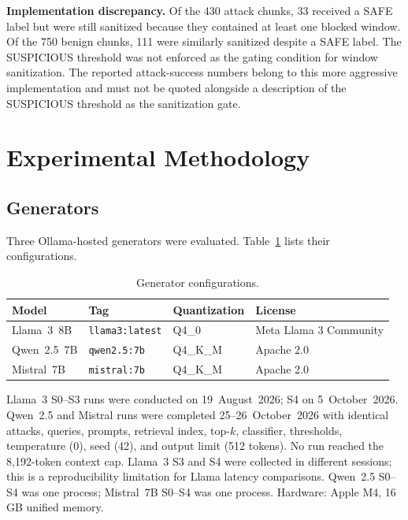 \documentclass[journal]{IEEEtran}
\begin{document}
\textbf{Implementation discrepancy.} Of the 430 attack chunks, 33 received a
SAFE label but were still sanitized because they contained at least one blocked
window. Of the 750 benign chunks, 111 were similarly sanitized despite a SAFE
label. The SUSPICIOUS threshold was not enforced as the gating condition for
window sanitization. The reported attack-success numbers belong to this more
aggressive implementation and must not be quoted alongside a description of the
SUSPICIOUS threshold as the sanitization gate.

\section{Experimental Methodology}
\label{sec:methodology}

\subsection{Generators}

Three Ollama-hosted generators were evaluated. Table~\ref{tab:generators}
lists their configurations.

\begin{table}[!t]
\centering
\caption{Generator configurations.}
\label{tab:generators}
\begin{tabular}{@{}llll@{}}
\toprule
Model & Tag & Quantization & License \\
\midrule
Llama~3~8B & \texttt{llama3:latest} & Q4\_0 & Meta Llama 3 Community \\
Qwen~2.5~7B & \texttt{qwen2.5:7b} & Q4\_K\_M & Apache 2.0 \\
Mistral~7B & \texttt{mistral:7b} & Q4\_K\_M & Apache 2.0 \\
\bottomrule
\end{tabular}
\end{table}

Llama~3 S0--S3 runs were conducted on 19~August~2026; S4 on 5~October~2026.
Qwen~2.5 and Mistral runs were completed 25--26~October~2026 with identical
attacks, queries, prompts, retrieval index, top-$k$, classifier, thresholds,
temperature (0), seed (42), and output limit (512 tokens). No run reached the
8,192-token context cap. Llama~3 S3 and S4 were collected in different sessions;
this is a reproducibility limitation for Llama latency comparisons. Qwen~2.5
S0--S4 was one process; Mistral~7B S0--S4 was one process. Hardware: Apple M4,
16\,GB unified memory.
\end{document}
